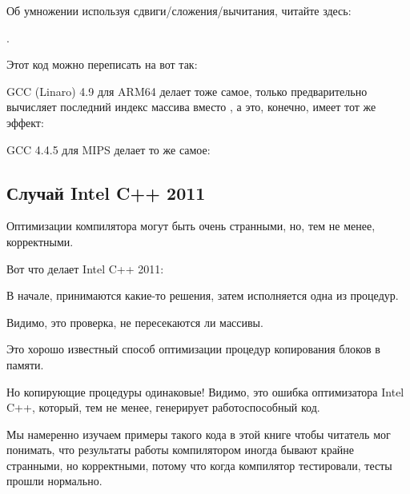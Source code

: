 Об умножении используя сдвиги/сложения/вычитания, читайте здесь:
 
.

Этот код можно переписать на \CCpp вот так:



GCC (Linaro) 4.9 для ARM64 делает тоже самое, только предварительно вычисляет последний индекс массива  вместо
, а это, конечно, имеет тот же эффект:




GCC 4.4.5 для MIPS делает то же самое:



\subsection{Случай Intel C++ 2011}
\myindex{\CompilerAnomaly}
\label{loops_iterators_loop_anomaly}

Оптимизации компилятора могут быть очень странными, но, тем не менее, корректными.

Вот что делает Intel C++ 2011:



В начале, принимаются какие-то решения, затем исполняется одна из процедур.

Видимо, это проверка, не пересекаются ли массивы.

Это хорошо известный способ оптимизации процедур копирования блоков в памяти.

Но копирующие процедуры одинаковые!
Видимо, это ошибка оптимизатора Intel C++, который, тем не менее, генерирует работоспособный код.

Мы намеренно изучаем примеры такого кода в этой книге чтобы читатель мог понимать, что результаты работы
компилятором иногда бывают крайне странными, но корректными, потому что когда компилятор тестировали, 
тесты прошли нормально.

